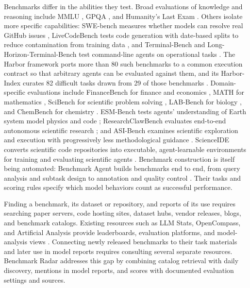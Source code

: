 \documentclass[11pt]{article}
\begin{document}
Benchmarks differ in the abilities they test. Broad evaluations of knowledge and reasoning include MMLU \citep{hendrycks2021mmlu}, GPQA \citep{rein2023gpqa}, and Humanity's Last Exam \citep{phan2025hle}. Others isolate more specific capabilities: SWE-bench measures whether models can resolve real GitHub issues \citep{jimenez2023swebench}, LiveCodeBench tests code generation with date-based splits to reduce contamination from training data \citep{jain2024livecodebench}, and Terminal-Bench and Long-Horizon-Terminal-Bench test command-line agents on operational tasks \citep{merrill2026terminalbench,li2026long}. The Harbor framework ports more than 80 such benchmarks to a common execution contract so that arbitrary agents can be evaluated against them, and its Harbor-Index curates 82 difficult tasks drawn from 29 of those benchmarks \citep{shi2026harbor,harborframework}. Domain-specific evaluations include FinanceBench for finance and economics \citep{islam2023financebench}, MATH for mathematics \citep{hendrycks2021math}, SciBench for scientific problem solving \citep{wang2023scibench}, LAB-Bench for biology \citep{laurent2024labbench}, and ChemBench for chemistry \citep{mirza2024chembench}. ESM-Bench tests agents' understanding of Earth system model physics and code \citep{wu2026esm}; ResearchClawBench evaluates end-to-end autonomous scientific research \citep{xu2026researchclawbench}; and ASI-Bench examines scientific exploration and execution with progressively less methodological guidance \citep{zhou2026asi}. ScienceIDE converts scientific code repositories into executable, agent-learnable environments for training and evaluating scientific agents \citep{geng2026scienceide}. Benchmark construction is itself being automated: Benchmark Agent builds benchmarks end to end, from query analysis and subtask design to annotation and quality control \citep{xiong2026benchmark}. Their tasks and scoring rules specify which model behaviors count as successful performance.

Finding a benchmark, its dataset or repository, and reports of its use requires searching paper servers, code hosting sites, dataset hubs, vendor releases, blogs, and benchmark catalogs. Existing resources such as LLM Stats, OpenCompass, and Artificial Analysis provide leaderboards, evaluation platforms, and model-analysis views \citep{llmstats2026benchmarks,opencompass2026datasetstatistics,artificialanalysis2026methodology}. Connecting newly released benchmarks to their task materials and later use in model reports requires consulting several separate resources. Benchmark Radar addresses this gap by combining catalog retrieval with daily discovery, mentions in model reports, and scores with documented evaluation settings and sources.
\end{document}
